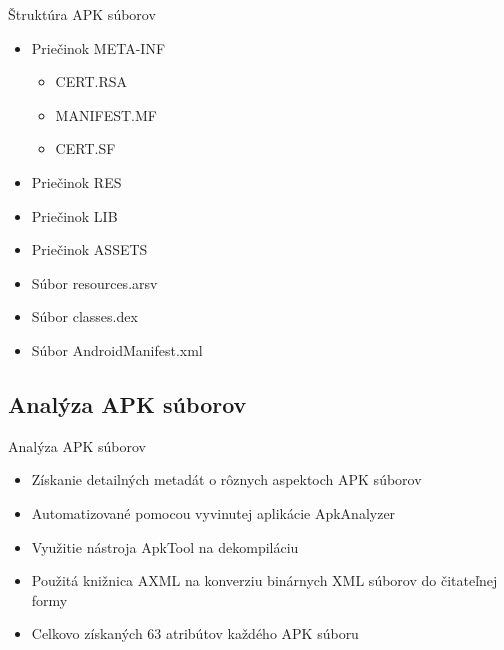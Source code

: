 \documentclass{beamer}
\begin{document}
    \begin{frame}[label=lists]{Štruktúra APK súborov}
	 \begin{itemize}
		\item Priečinok META-INF
		\begin{itemize}
			\item CERT.RSA
			\item MANIFEST.MF
			\item CERT.SF
		\end{itemize}
		\item Priečinok RES
		\item Priečinok LIB
		\item Priečinok ASSETS
		\item Súbor resources.arsv
		\item Súbor classes.dex
		\item Súbor AndroidManifest.xml
	
	\end{itemize}	 
   \end{frame} 
 
 \subsection{Analýza APK súborov}
  \begin{frame}[label=lists]{Analýza APK súborov}
	\begin{itemize}
		\item Získanie detailných metadát o rôznych aspektoch APK súborov
		\item Automatizované pomocou vyvinutej aplikácie ApkAnalyzer\cite{apkanalyzer}
		\item Využitie nástroja ApkTool na dekompiláciu \cite{apktool}
		\item Použitá knižnica AXML na konverziu binárnych XML súborov do čitateľnej formy \cite{axml}
		\item Celkovo získaných 63 atribútov každého APK súboru
	\end{itemize}	    
   \end{frame} 
   
\end{document}
